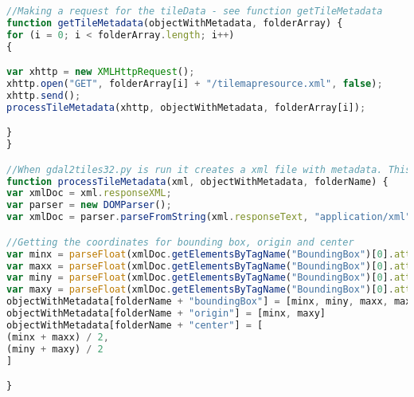 \begin{lstlisting}[language=JavaScript, caption={The JavaScript for getting Metadata about tiles}, label= VoresJS,escapechar=|]
//Making a request for the tileData - see function getTileMetadata
function getTileMetadata(objectWithMetadata, folderArray) {
for (i = 0; i < folderArray.length; i++)
{

var xhttp = new XMLHttpRequest();
xhttp.open("GET", folderArray[i] + "/tilemapresource.xml", false);
xhttp.send();
processTileMetadata(xhttp, objectWithMetadata, folderArray[i]);

}
}

//When gdal2tiles32.py is run it creates a xml file with metadata. This function extracts the relevant data
function processTileMetadata(xml, objectWithMetadata, folderName) {
var xmlDoc = xml.responseXML;
var parser = new DOMParser();
var xmlDoc = parser.parseFromString(xml.responseText, "application/xml");

//Getting the coordinates for bounding box, origin and center
var minx = parseFloat(xmlDoc.getElementsByTagName("BoundingBox")[0].attributes.minx.value);
var maxx = parseFloat(xmlDoc.getElementsByTagName("BoundingBox")[0].attributes.maxx.value);
var miny = parseFloat(xmlDoc.getElementsByTagName("BoundingBox")[0].attributes.miny.value);
var maxy = parseFloat(xmlDoc.getElementsByTagName("BoundingBox")[0].attributes.maxy.value);
objectWithMetadata[folderName + "boundingBox"] = [minx, miny, maxx, maxy]
objectWithMetadata[folderName + "origin"] = [minx, maxy]
objectWithMetadata[folderName + "center"] = [
(minx + maxx) / 2,
(miny + maxy) / 2
]

}
\end{lstlisting}


